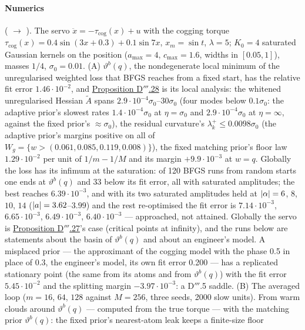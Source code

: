 \paragraph{Numerics} ( $\to$ ). The servo
$\ddot x = -\tau_{\mathrm{cog}}(x) + u$ with the cogging torque
$\tau_{\mathrm{cog}}(x) = 0.4\sin(3x + 0.3) + 0.1\sin7x$, $x_m = \sin t$, $\lambda = 5$; $K_0 = 4$ saturated Gaussian
kernels on the position ($a_{\max} = 4$, $c_{\max} = 1.6$, widths in $[0.05,1]$), masses $1/4$, $\sigma_0 = 0.01$. (A)
$\vartheta^b(q)$, the nondegenerate local minimum of the unregularised weighted loss that BFGS reaches from a fixed
start, has the relative fit error $1.46\cdot10^{-2}$, and \hyperref[res:thmDppp:28]{Proposition D$'''$.28} is its
local analysis: the whitened unregularised Hessian $\tilde A$ spans $2.9\cdot10^{-4}\sigma_0$--$30\sigma_0$ (four
modes below $0.1\sigma_0$: the adaptive prior's slowest rates $1.4\cdot10^{-4}\sigma_0$ at $\eta = \sigma_0$ and
$2.9\cdot10^{-4}\sigma_0$ at $\eta = \infty$, against the fixed prior's $\approx\sigma_0$), the residual curvature's
$\lambda^+_k\le0.0098\sigma_0$ (the adaptive prior's margins positive on all of
$W_g = \{w > (0.061,0.085,0.119,0.008)\}$), the fixed matching prior's floor law $1.29\cdot10^{-2}$ per unit of
$1/m - 1/M$ and its margin $+9.9\cdot10^{-3}$ at $w = q$. Globally the loss has its infimum at the saturation: of 120
BFGS runs from random starts one ends at $\vartheta^b(q)$ and 33 below its fit error, all with saturated amplitudes;
the best reaches $6.39\cdot10^{-3}$, and with its two saturated amplitudes held at $\lvert \alpha\rvert = 6$, $8$, $10$, $14$
($\lvert a\rvert = 3.62$--$3.99$) and the rest re-optimised the fit error is $7.14\cdot10^{-3}$, $6.65\cdot10^{-3}$,
$6.49\cdot10^{-3}$, $6.40\cdot10^{-3}$ --- approached, not attained. Globally the servo is
\hyperref[res:thmDppp:27]{Proposition D$'''$.27}'s case (critical points at infinity), and the runs below are
statements about the basin of $\vartheta^b(q)$ and about an engineer's model. A misplaced prior --- the approximant
of the cogging model with the phase 0.5 in place of 0.3, the engineer's model, its own fit error 0.200 --- has a
replicated stationary point (the same from its atoms and from $\vartheta^b(q)$) with the fit error $5.45\cdot10^{-2}$
and the splitting margin $-3.97\cdot10^{-3}$: a D$'''$.5 saddle. (B) The averaged loop ($m = 16$, $64$, $128$ against
$M = 256$, three seeds, 2000 slow units). From warm clouds around $\vartheta^b(q)$ --- computed from the true torque
--- with the matching prior $\vartheta^b(q)$: the fixed prior's nearest-atom leak keeps a finite-size floor
